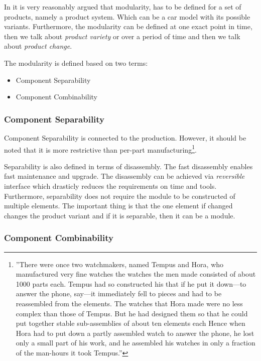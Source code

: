 \documentclass[]{scrartcl}
\begin{document}
In \cite{Salvador2007} it is very reasonably argued that modularity, has to be defined for a set of products, namely a product system. Which can be a car model with its possible variants.  Furthermore, the modularity can be defined at one exact point in time, then we talk about \emph{product variety} or over a period of time and then we talk about \emph{product change}.

The modularity is defined based on two terms:
\begin{itemize}
	\item Component Separability
	\item Component Combinability
\end{itemize}

\subsubsection{Component Separability}

Component Separability is connected to the production. However, it should be noted that it is more restrictive than per-part manufacturing\footnote{''There were once two watchmakers, named Tempus and Hora, who manufactured very fine watches the watches	the men made consisted of about 1000 parts each. Tempus had so constructed his that if he put it down—to answer the phone, say—it immediately fell to pieces and had to be reassembled from the elements. The watches that Hora made were no less complex than those of Tempus. But he had designed them so that he could put together stable sub-assemblies of about ten elements each Hence when Hora had to put down a partly assembled watch to answer the phone, he lost only a small part of his work, and he assembled his watches in only a fraction of the man-hours it took Tempus.''\cite{Salvador2007}}. 

Separability is also defined in terms of disassembly. The fast disassembly enables fast maintenance and upgrade. The disassembly can be achieved via \emph{reversible} interface which drasticly reduces the requirements on time and tools. Furthermore, separability does not require the module to be constructed of multiple elements. The important thing is that the one element if changed changes the product variant and if it is separable, then it can be a module.

\subsubsection{Component Combinability}
\end{document}
